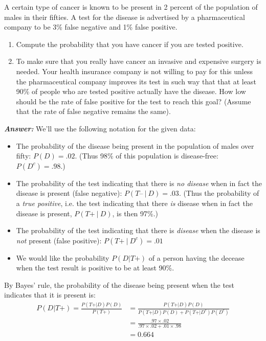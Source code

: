\documentclass[12pt]{article}
\newenvironment{question}[2][Question]{\begin{trivlist}
\item[\hskip \labelsep {\bfseries #1}\hskip \labelsep {\bfseries #2.}]}{\end{trivlist}}
\begin{document}
\bigskip
\bigskip
\begin{question}{2.1} A certain type of cancer is known to be present in 2 percent of the population of males in their fifties.
A test for the disease is advertised by a pharmaceutical company to be 3\% false negative and 1\% false positive.
\begin{enumerate}
\item{ Compute the probability that you have cancer if you are tested positive.}
\item{To make sure that you really have cancer an invasive and expensive surgery is needed. Your health insurance company is not willing to pay for this unless the pharmaceutical company improves its test in such way that that at least 90\% of people who are tested positive actually have the disease. How low should be the rate of false positive for the test to reach this goal? (Assume that the rate of false negative remains the same).}
\end{enumerate}

\end{question}

 \textbf{\emph{Answer:} } 
 We'll use the following notation for the given data:
 \begin{itemize}
   \item The probability of the disease being present in the population of males over fifty: $P(D) = .02$. (Thus 98\% of this population is disease-free: $P(D^c) = .98$.)
  \item The probability of the test indicating that there is \emph{no disease} when in fact the disease is present (false negative): $P(T\text{--}\ | \ D) = .03$. (Thus the probability of a \emph{true positive}, i.e. the test indicating that there \emph{is} disease when in fact the disease is present, $P(T\text{+}\ | \ D)$, is then 97\%.)
  \item The probability of the test indicating that there is \emph{disease} when the disease is \emph{not} present (false positive): $P(T\text{+}\ | \ D^c) = .01$
  \item We would like the probability $P(D | T\text{+})$ of a person having the decease when the test result is positive to be at least 90\%. 
\end{itemize}

By Bayes' rule, the probability of the disease being present when the test indicates that it is present is:
 \begin{align*}
P(D | T\text{+}) = \frac{P(T\text{+} | D) P(D) } {P(T\text{+} )} 
&= \frac{P(T\text{+} | D) P(D) } {P(T\text{+} | D) P(D) + P(T\text{+} | D^c) P(D^c) } \\
&= \frac{.97 \times .02 } {.97 \times .02 + .01 \times .98} \\
&= 0.664
\end{align*}
\end{document}
